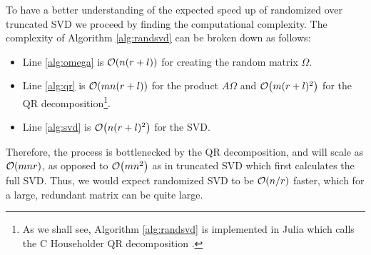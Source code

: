 \documentclass[11pt, a4paper, twocolumn]{article}
\let\originalleft\left
\let\originalright\right
\renewcommand{\left}{\mathopen{}\mathclose\bgroup\originalleft}
\renewcommand{\right}{\aftergroup\egroup\originalright}
\providecommand{\bigO}[1]{\ensuremath{\mathop{}\mathopen{}\mathcal{O}\mathopen{}\left(#1\right)}}
\begin{document}
To have a better understanding of the expected speed up of randomized over truncated SVD we proceed by finding the computational complexity. The complexity of Algorithm \ref{alg:randsvd} can be broken down as follows:
\begin{itemize}
    \item Line \ref{alg:omega} is $\bigO{n(r + l)}$ for creating the random matrix $\Omega$.
    \item Line \ref{alg:qr} is $\bigO{mn(r + l)}$ for the product $A \Omega$ and $\bigO{m(r + l)^2}$ for the QR decomposition\footnote{As we shall see, Algorithm \ref{alg:randsvd} is implemented in Julia which calls the C Householder QR decomposition \cite{juliala}.}.
    \item Line \ref{alg:svd} is $\bigO{n(r + l)^2}$ for the SVD.
\end{itemize}
Therefore, the process is bottlenecked by the QR decomposition, and will scale as $\bigO{mnr}$, as opposed to $\bigO{mn^2}$ as in truncated SVD which first calculates the full SVD. Thus, we would expect randomized SVD to be $\bigO{n / r}$ faster, which for a large, redundant matrix can be quite large.
\end{document}
